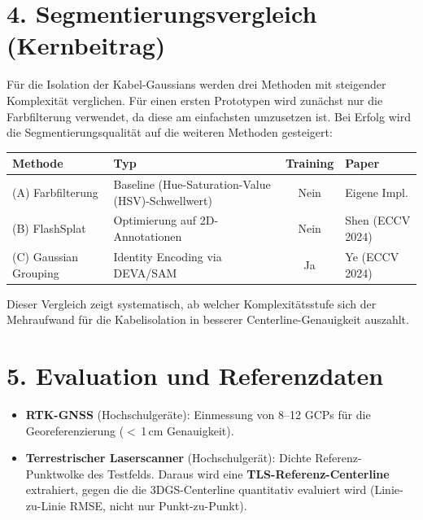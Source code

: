\documentclass[11pt, a4paper]{article}
\begin{document}
\section{4. Segmentierungsvergleich (Kernbeitrag)}

F\"ur die Isolation der Kabel-Gaussians werden drei Methoden mit steigender Komplexit\"at verglichen. F\"ur einen ersten Prototypen wird zun\"achst nur die Farbfilterung verwendet, da diese am einfachsten umzusetzen ist. Bei Erfolg wird die Segmentierungsqualit\"at auf die weiteren Methoden gesteigert:

\begin{center}
    \small
    \begin{tabular}{p{3.5cm} p{6.5cm} c p{3cm}}
        \toprule
        \textbf{Methode}      & \textbf{Typ}                                      & \textbf{Training} & \textbf{Paper}   \\
        \midrule
        (A) Farbfilterung     & Baseline (Hue-Saturation-Value (HSV)-Schwellwert) & Nein              & Eigene Impl.     \\
        (B) FlashSplat        & Optimierung auf 2D-Annotationen                   & Nein              & Shen (ECCV 2024) \\
        (C) Gaussian Grouping & Identity Encoding via DEVA/SAM                    & Ja                & Ye (ECCV 2024)   \\
        \bottomrule
    \end{tabular}
\end{center}

Dieser Vergleich zeigt systematisch, ab welcher Komplexit\"atsstufe sich der Mehraufwand f\"ur die Kabelisolation in besserer Centerline-Genauigkeit auszahlt.

\section{5. Evaluation und Referenzdaten}

\begin{itemize}[noitemsep, leftmargin=1.5em]
    \item \textbf{RTK-GNSS} (Hochschulger\"ate): Einmessung von 8--12 GCPs f\"ur die Georeferenzierung ($<$\,1\,cm Genauigkeit).
    \item \textbf{Terrestrischer Laserscanner} (Hochschulger\"at): Dichte Referenz-Punktwolke des Testfelds. Daraus wird eine \textbf{TLS-Referenz-Centerline} extrahiert, gegen die die 3DGS-Centerline quantitativ evaluiert wird (Linie-zu-Linie RMSE, nicht nur Punkt-zu-Punkt).
\end{itemize}
\end{document}
